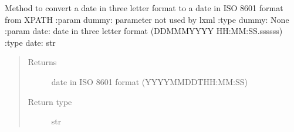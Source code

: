 
\begin{fulllineitems}
\label{\detokenize{s2boa.ingestions:s2boa.ingestions.xpath_functions.three_letter_to_iso_8601}}
\sphinxAtStartPar
Method to convert a date in three letter format to a date in ISO 8601 format from XPATH
:param dummy: parameter not used by lxml
:type dummy: None
:param date: date in three letter format (DD\sphinxhyphen{}MMM\sphinxhyphen{}YYYY HH:MM:SS.ssssss)
:type date: str
\begin{quote}\begin{description}
\item[{Returns}] \leavevmode
\sphinxAtStartPar
date in ISO 8601 format (YYYY\sphinxhyphen{}MM\sphinxhyphen{}DDTHH:MM:SS)

\item[{Return type}] \leavevmode
\sphinxAtStartPar
str

\end{description}\end{quote}

\end{fulllineitems}



